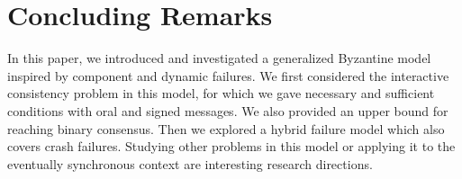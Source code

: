 
\section{Concluding Remarks}

In this paper, we introduced and investigated a generalized Byzantine model inspired by component and dynamic failures. We first considered the interactive consistency problem in this model, for which we gave necessary and sufficient conditions with oral and signed messages. We also provided an upper bound for reaching binary consensus. Then we explored a hybrid failure model which also covers crash failures.
Studying other problems in this model or applying it to the eventually synchronous 
context are interesting research directions. 


